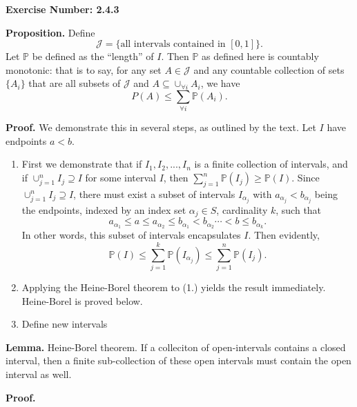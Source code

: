 \documentclass{article}
\begin{document}
\noindent \textbf{Exercise Number: 2.4.3}  %

\bigskip 

\noindent \textbf{Proposition.} Define \[\mathcal{J} = \{\text{all intervals contained in } [0,1]\}.\] Let $\mathbb{P}$ be defined as the ``length'' of $I$. Then $\mathbb{P}$ as defined here is countably monotonic: that is to say, for any set $A \in \mathcal{J}$ and any countable collection of sets $\{A_i\}$ that are all subsets of $\mathcal{J}$ and $A \subseteq \cup_{\forall i} A_i$, we have \[P(A) \leq \sum_{\forall i} \mathbb{P}(A_i).\]

\bigskip

\noindent \textbf{Proof.} We demonstrate this in several steps, as outlined by the text. Let $I$ have endpoints $a < b$. 

\begin{enumerate}

\item First we demonstrate that if $I_1, I_2, ..., I_n$ is a finite collection of intervals, and if
$\cup _{j = 1}^n I_j \supseteq I$ for some interval $I$, then $\sum_{j = 1}^n \mathbb{P}(I_j) \geq \mathbb{P}(I)$. Since $\cup _{j = 1}^n I_j \supseteq I$, there must exist a subset of intervals $I_{\alpha_j}$ with $a_{\alpha_j} < b_{\alpha_j}$ being the endpoints, indexed by an index set $\alpha_j \in S$, cardinality $k$,  such that \[a_{\alpha_1} \leq a \leq  a_{\alpha_2} \leq b_{\alpha_1} < b_{\alpha_2} \cdots < b \leq b_{\alpha_k}.\] In other words, this subset of intervals encapsulates $I$. Then evidently, \[\mathbb{P}(I) \leq \sum_{j = 1}^k \mathbb{P}(I_{\alpha_j}) \leq \sum_{j = 1}^n \mathbb{P}(I_j).\]

\item Applying the Heine-Borel theorem to (1.) yields the result immediately. Heine-Borel is proved below. 

\item Define new intervals 

\end{enumerate}


\bigskip

\bigskip

\noindent \textbf{Lemma.} Heine-Borel theorem. If a colleciton of open-intervals contains a closed interval, then a finite sub-collection of these open intervals must contain the open interval as well. 

\medskip

\noindent \textbf{Proof.} 
\end{document}

